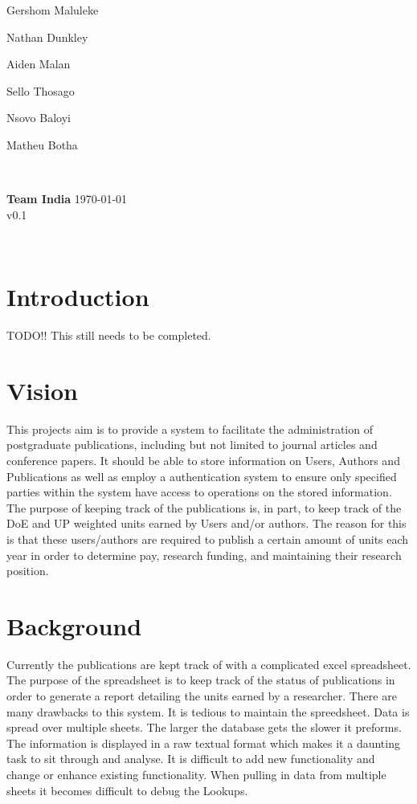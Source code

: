 \documentclass{article}
\begin{document}
\begin{titlepage}
\begin{minipage}{0.4\textwidth}
\begin{flushleft}
	Gershom Maluleke

	Nathan Dunkley

	Aiden Malan

	Sello Thosago

	Nsovo Baloyi

	Matheu Botha 
	\end{flushleft}
	\end{minipage}
	~
	\begin{minipage}{0.4\textwidth}
	\begin{flushright} \large
	{ \huge \bfseries Team India }%
	{\large \today}\\
	{\large v0.1}
	\end{flushright}
	\end{minipage}\\[4cm]
\end{titlepage}


	\newpage
	
	\section{Introduction}
	
	TODO!! This still needs to be completed.

	\section{Vision}

	This projects aim is to provide a system to facilitate the administration of postgraduate publications, including but not limited to journal articles and conference papers. It should be able to store information on Users, Authors and Publications as well as employ a authentication system to ensure only specified parties within the system have access to operations on the stored information.
	The purpose of keeping track of the publications is, in part, to keep track of the DoE and UP weighted units earned by Users and/or authors. The reason for this is that these users/authors are required to publish a certain amount of units each year in order to determine pay, research funding, and maintaining their research position.

	\section{Background}
	Currently the publications are kept track of with a complicated excel spreadsheet. The purpose of the spreadsheet is to keep track of the status of publications in order to generate a report detailing the units earned by a researcher. There are many drawbacks to this system. It is tedious to maintain the spreedsheet. Data is spread over multiple sheets. The larger the database gets the slower it preforms. The information is displayed in a raw textual format which makes it a daunting task to sit through and analyse. It is difficult to add new functionality and change or enhance existing functionality. When pulling in data from multiple sheets it becomes difficult to debug the Lookups.
\end{document}
